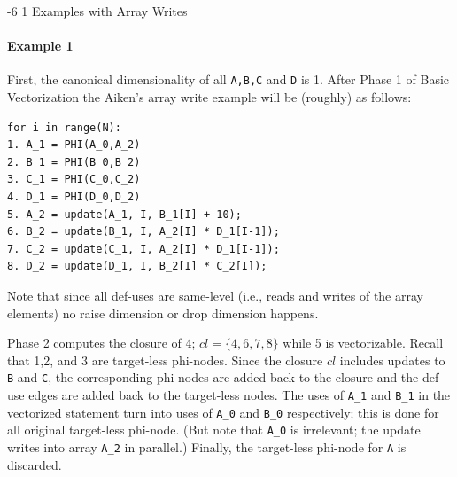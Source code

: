 \documentclass[sigconf, screen, natbib=false, dvipsnames, table]{acmart}
\makeatletter
\renewcommand{\subsubsection}{\@startsection{subsubsection}{3}{\z@}%
                        {-6\p@ \@plus -4\p@ \@minus -4\p@}%
                        {1\p@ \@plus 1\p@ \@minus 0\p@}%
                        {\normalfont\normalsize\bfseries\boldmath}}
\theoremstyle{definition}
\makeatother
\begin{document}
\subsubsection{Examples with Array Writes}

\paragraph{Example 1}

First, the canonical dimensionality of all \texttt{A,B,C} and \texttt{D} is 1. 
After Phase 1 of Basic Vectorization the Aiken's array write example will be (roughly) as follows:

{\small
\begin{verbatim}
for i in range(N):
1. A_1 = PHI(A_0,A_2)
2. B_1 = PHI(B_0,B_2)
3. C_1 = PHI(C_0,C_2)
4. D_1 = PHI(D_0,D_2)
5. A_2 = update(A_1, I, B_1[I] + 10); 
6. B_2 = update(B_1, I, A_2[I] * D_1[I-1]);
7. C_2 = update(C_1, I, A_2[I] * D_1[I-1]);
8. D_2 = update(D_1, I, B_2[I] * C_2[I]);
\end{verbatim}
}

Note that since all def-uses are same-level (i.e., reads and writes of the array elements) 
no raise dimension or drop dimension happens.

Phase 2 computes the closure of 4; $cl = \{4,6,7, 8\}$ 
while 5 is vectorizable. Recall that 1,2, and 3 are target-less phi-nodes. Since the closure $cl$ includes updates to \texttt{B} and \texttt{C},
the corresponding phi-nodes are added back to the closure and the def-use edges are added back to the target-less nodes. The uses of \texttt{A\_1} and \texttt{B\_1} in the vectorized statement
turn into uses of \texttt{A\_0} and \texttt{B\_0} respectively; this is done for all original target-less phi-node. (But note that \texttt{A\_0} is irrelevant; the update writes into array \texttt{A\_2} in parallel.)
Finally, the target-less phi-node for \texttt{A} is discarded. 
\end{document}
